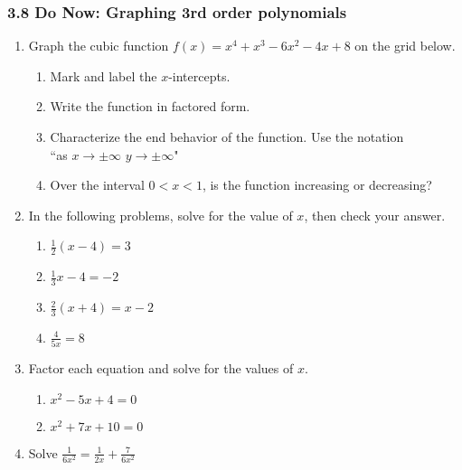 \documentclass[12pt, twoside]{article}
\begin{document}
\subsubsection*{3.8 Do Now: Graphing 3rd order polynomials}
\begin{enumerate}
\item Graph the cubic function $f(x) = x^{4}+x^{3}-6x^{2}-4x+8$ on the grid below. 
  \begin{enumerate}
      \item Mark and label the $x$-intercepts. 
      \item Write the function in factored form. \vspace{1.5cm}
      \item Characterize the end behavior of the function. Use the notation \\
      ``as $x \rightarrow \pm \infty$ $y \rightarrow\pm \infty$"    
      \item Over the interval $0<x<1$, is the function increasing or decreasing? 
  \end{enumerate} \hspace{2cm}
  
    \begin{center}
    \end{center}

\newpage
\item In the following problems, solve for the value of $x$, then check your answer.
\begin{multicols}{2}
  \begin{enumerate}[itemsep=3cm]
    \item $\frac{1}{2}(x - 4) = 3$
    \item $\frac{1}{3} x - 4 = -2$
    \item $\frac{2}{3}(x + 4) = x - 2$
    \item $\displaystyle \frac{4}{5x} = 8$
  \end{enumerate}
  \end{multicols} \vspace{4cm}

\item Factor each equation and solve for the values of $x$.
  \begin{multicols}{2}
    \begin{enumerate}[itemsep=5cm]
    \item $x^2-5x+4=0$
    \item $x^2+7x+10=0$
  \end{enumerate}
  \end{multicols} \vspace{4cm}

\item Solve $\displaystyle \frac{1}{6x^2} = \frac{1}{2x} + \frac{7}{6x^2}$ 

\end{enumerate}
\end{document}
